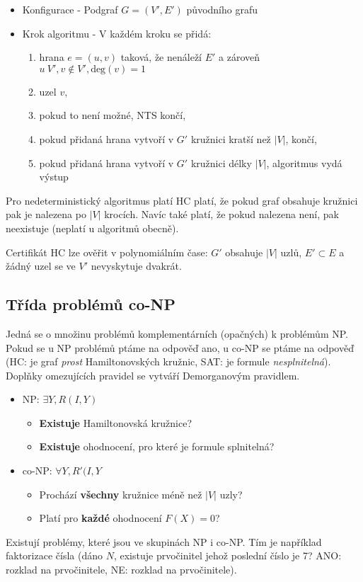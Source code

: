 \begin{itemize}
    \item Konfigurace - Podgraf $G = (V', E')$ původního grafu
    \item Krok algoritmu - V každém kroku se přidá:
    
    \begin{enumerate}
        \item hrana $e = (u, v)$ taková, že nenáleží $E'$ a zároveň $u \ V', v \notin V', \textrm{deg}(v) = 1$
        \item uzel $v$,
        \item pokud to není možné,  NTS končí,
        \item pokud přidaná hrana vytvoří v $G'$ kružnici kratší než $|V|$,  končí,
        \item pokud přidaná hrana vytvoří v $G'$ kružnici délky $|V|$, algoritmus vydá výstup 
    \end{enumerate}
\end{itemize}

Pro nedeterministický algoritmus platí HC platí, že pokud graf obsahuje kružnici pak je nalezena po $|V|$ krocích.
Navíc také platí, že pokud nalezena není, pak neexistuje (neplatí u algoritmů obecně).

Certifikát HC lze ověřit v polynomiálním čase: $G'$ obsahuje $|V|$ uzlů, $E' \subset E$ a žádný uzel se ve $V'$ nevyskytuje dvakrát.

\subsection{Třída problémů co-NP}

Jedná se o množinu problémů komplementárních (opačných) k problémům NP.
Pokud se u NP problémů ptáme na odpověď ano, u co-NP se ptáme na odpověď  (HC: je graf \textit{prost} Hamiltonovských kružnic, SAT: je formule \textit{nesplnitelná}).
Doplňky omezujících pravidel se vytváří Demorganovým pravidlem.

\begin{itemize}
    \item NP: $\exists Y, R(I, Y)$
        \begin{itemize}
            \item \textbf{Existuje} Hamiltonovská kružnice?
            \item \textbf{Existuje} ohodnocení, pro které je formule splnitelná?
        \end{itemize}

    \item co-NP: $\forall Y, R'(I, Y$
    \begin{itemize}
        \item Prochází \textbf{všechny} kružnice méně než $|V|$ uzly?
        \item Platí pro \textbf{každé} ohodnocení $F(X) = 0$?
    \end{itemize}
\end{itemize}

Existují problémy, které jsou ve skupinách NP i co-NP.
Tím je například faktorizace čísla (dáno $N$, existuje prvočinitel jehož poslední číslo je 7? ANO: rozklad na prvočinitele, NE: rozklad na prvočinitele).
